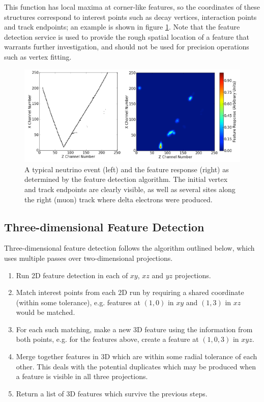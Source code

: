 This function has local maxima at corner-like features, so the coordinates of these structures correspond to interest points such as decay vertices, interaction points and track endpoints; an example is shown in figure \ref{fig:feature-response}. Note that the feature detection service is used to provide the rough spatial location of a feature that warrants further investigation, and should not be used for precision operations such as vertex fitting.

\begin{figure}
    \includegraphics[width=\textwidth]{chapters/latte_images/feature-response}
    \caption[Feature response for a typical neutrino event]{\label{fig:feature-response}A typical neutrino event (left) and the feature response (right) as determined by the feature detection algorithm. The initial vertex and track endpoints are clearly visible, as well as several sites along the right (muon) track where delta electrons were produced.}
\end{figure}

\subsection{Three-dimensional Feature Detection}
Three-dimensional feature detection follows the algorithm outlined below, which uses multiple passes over two-dimensional projections.
\begin{enumerate}
    \item Run 2D feature detection in each of $xy$, $xz$ and $yz$ projections.
    \item Match interest points from each 2D run by requiring a shared coordinate (within some tolerance), e.g. features at $(1,0)$ in $xy$ and $(1,3)$ in $xz$ would be matched.
    \item For each such matching, make a new 3D feature using the information from both points, e.g. for the features above, create a feature at $(1,0,3)$ in $xyz$.
    \item Merge together features in 3D which are within some radial tolerance of each other. This deals with the potential duplicates which may be produced when a feature is visible in all three projections.
    \item Return a list of 3D features which survive the previous steps.
\end{enumerate}

